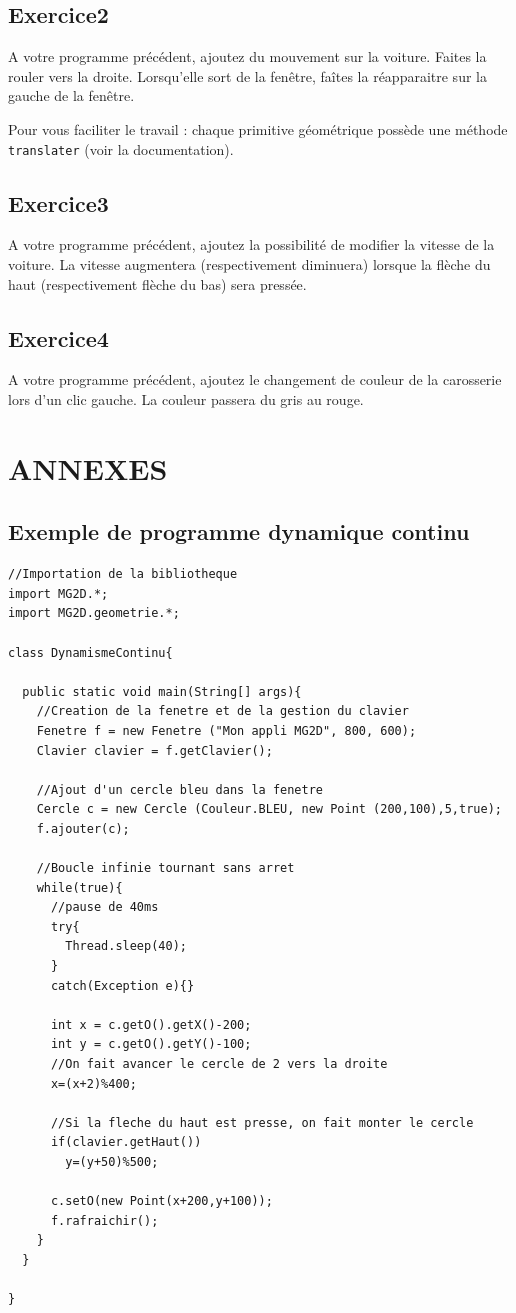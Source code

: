 \documentclass[12pt]{exam}
\begin{document}
\subsection{Exercice2}
A votre programme précédent, ajoutez du mouvement sur la voiture. Faites la rouler vers la droite. Lorsqu'elle sort de la fenêtre, faîtes la réapparaitre sur la gauche de la fenêtre.

Pour vous faciliter le travail : chaque primitive géométrique possède une méthode \texttt{translater} (voir la documentation).

\subsection{Exercice3}
A votre programme précédent, ajoutez la possibilité de modifier la vitesse de la voiture. La vitesse augmentera (respectivement diminuera) lorsque la flèche du haut (respectivement flèche du bas) sera pressée.

\subsection{Exercice4}
A votre programme précédent, ajoutez le changement de couleur de la carosserie lors d'un clic gauche. La couleur passera du gris au rouge.


\newpage
\section{ANNEXES}
\subsection{Exemple de programme dynamique continu}
\label{dynContinu}
\begin{lstlisting}
//Importation de la bibliotheque
import MG2D.*;
import MG2D.geometrie.*;

class DynamismeContinu{

  public static void main(String[] args){
    //Creation de la fenetre et de la gestion du clavier
    Fenetre f = new Fenetre ("Mon appli MG2D", 800, 600);
    Clavier clavier = f.getClavier();

    //Ajout d'un cercle bleu dans la fenetre
    Cercle c = new Cercle (Couleur.BLEU, new Point (200,100),5,true);
    f.ajouter(c);
	
    //Boucle infinie tournant sans arret
    while(true){
      //pause de 40ms
      try{
        Thread.sleep(40);
      }
      catch(Exception e){}
	 
      int x = c.getO().getX()-200;
      int y = c.getO().getY()-100;
      //On fait avancer le cercle de 2 vers la droite
      x=(x+2)%400;
	    
      //Si la fleche du haut est presse, on fait monter le cercle
      if(clavier.getHaut())
        y=(y+50)%500;
      
      c.setO(new Point(x+200,y+100));
      f.rafraichir();
    }
  }
  
}
\end{lstlisting}
\newpage
\end{document}
